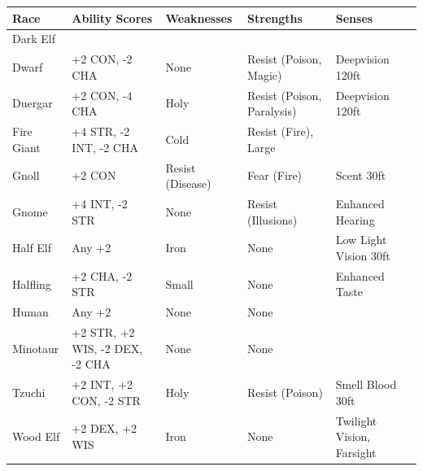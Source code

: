 \begin{tabular} { l p{4cm} l l l }
    Race & Ability Scores & Weaknesses & Strengths & Senses \\
    \hline
    Dark Elf & \\
    Dwarf & +2 CON, -2 CHA & None & Resist (Poison, Magic) & Deepvision 120ft\\
    Duergar & +2 CON, -4 CHA & Holy & Resist (Poison, Paralysis) & Deepvision 120ft\\
    Fire Giant & +4 STR, -2 INT, -2 CHA & Cold & Resist (Fire), Large & \\
    Gnoll & +2 CON & Resist (Disease) & Fear (Fire) & Scent 30ft\\
    Gnome & +4 INT, -2 STR & None & Resist (Illusions) & Enhanced Hearing\\
    Half Elf & Any +2 & Iron & None & Low Light Vision 30ft\\
    Halfling & +2 CHA, -2 STR & Small & None & Enhanced Taste\\
    Human & Any +2 & None & None & \\
    Minotaur & +2 STR, +2 WIS, -2 DEX, -2 CHA & None & None &  \\
    Tzuchi & +2 INT, +2 CON, -2 STR & Holy & Resist (Poison) & Smell Blood 30ft\\
    Wood Elf & +2 DEX, +2 WIS & Iron & None & Twilight Vision, Farsight\\
\end{tabular}

